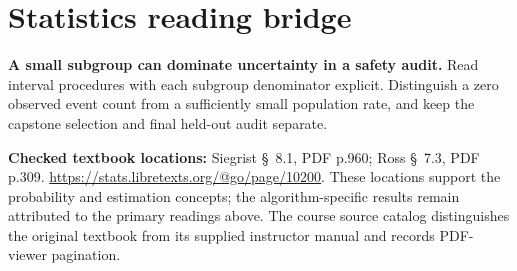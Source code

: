 \documentclass[11pt]{scrartcl}
\begin{document}
\section*{Statistics reading bridge}
\textbf{A small subgroup can dominate uncertainty in a safety audit.} Read interval procedures with each subgroup denominator explicit. Distinguish a zero observed event count from a sufficiently small population rate, and keep the capstone selection and final held-out audit separate.

\textbf{Checked textbook locations:} Siegrist \S~8.1, PDF p.960; Ross \S~7.3, PDF p.309. \url{https://stats.libretexts.org/@go/page/10200}. These locations support the probability and estimation concepts; the algorithm-specific results remain attributed to the primary readings above. The course source catalog distinguishes the original textbook from its supplied instructor manual and records PDF-viewer pagination.
\end{document}
